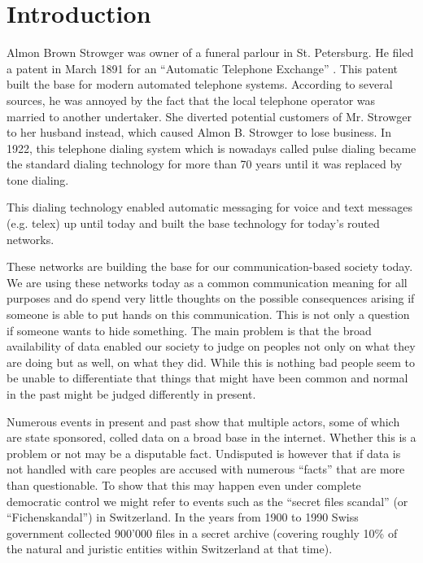 
\chapter{Introduction}
Almon Brown Strowger was owner of a funeral parlour in St. Petersburg. He filed a patent in March  1891 for an ``Automatic Telephone Exchange'' \cite{pulseDialingPatent}. This patent built the base for modern automated telephone systems. According to several sources, he was annoyed by the fact that the local telephone operator was married to another undertaker. She diverted potential customers of Mr. Strowger to her husband instead, which caused Almon B. Strowger to lose business. In 1922, this telephone dialing system which is nowadays called pulse dialing became the standard dialing technology for more than 70 years until it was replaced by tone dialing. 

This dialing technology enabled automatic messaging for voice and text messages (e.g. telex) up until today and built the base technology for today's routed networks. 

These networks are building the base for our communication-based society today. We are using these networks today as a common communication meaning for all purposes and do spend very little thoughts on the possible consequences arising if someone is able to put hands on this communication. This is not only a question if someone wants to hide something. The main problem is that the broad availability of data enabled our society to judge on peoples not only on what they are doing but as well, on what they did. While this is nothing bad people seem to be unable to differentiate that things that might have been common and normal in the past might be judged differently in present.

Numerous events in present and past show that multiple actors, some of which are state sponsored, colled data on a broad base in the internet. Whether this is a problem or not may be a disputable fact. Undisputed is however that if data is not handled with care peoples are accused with numerous ``facts'' that are more than questionable. To show that this may happen even under complete democratic control we might refer to events such as the ``secret files scandal'' (or ``Fichenskandal'') in Switzerland. In the years  from 1900 to 1990 Swiss government collected 900'000 files in a secret archive (covering roughly 10\% of the natural and juristic entities within Switzerland at that time).  

